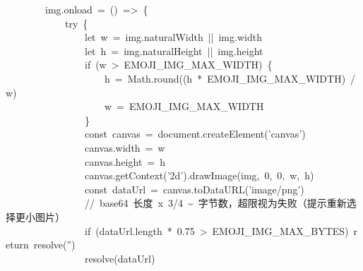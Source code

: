 \documentclass[a4paper,10pt]{article}
\begin{document}
{~~~~~~~~img.onload~=~()~=>~\{\\
~~~~~~~~~~~~try~\{\\
~~~~~~~~~~~~~~~~let~w~=~img.naturalWidth~||~img.width\\
~~~~~~~~~~~~~~~~let~h~=~img.naturalHeight~||~img.height\\
~~~~~~~~~~~~~~~~if~(w~>~EMOJI\_IMG\_MAX\_WIDTH)~\{\\
~~~~~~~~~~~~~~~~~~~~h~=~Math.round((h~*~EMOJI\_IMG\_MAX\_WIDTH)~/~w)\\
~~~~~~~~~~~~~~~~~~~~w~=~EMOJI\_IMG\_MAX\_WIDTH\\
~~~~~~~~~~~~~~~~\}\\
~~~~~~~~~~~~~~~~const~canvas~=~document.createElement('canvas')\\
~~~~~~~~~~~~~~~~canvas.width~=~w\\
~~~~~~~~~~~~~~~~canvas.height~=~h\\
~~~~~~~~~~~~~~~~canvas.getContext('2d').drawImage(img,~0,~0,~w,~h)\\
~~~~~~~~~~~~~~~~const~dataUrl~=~canvas.toDataURL('image/png')\\
~~~~~~~~~~~~~~~~//~base64~长度~x~3/4~\textasciitilde{}~字节数，超限视为失败（提示重新选择更小图片）\\
~~~~~~~~~~~~~~~~if~(dataUrl.length~*~0.75~>~EMOJI\_IMG\_MAX\_BYTES)~return~resolve('')\\
~~~~~~~~~~~~~~~~resolve(dataUrl)
}

\newpage
\end{document}
